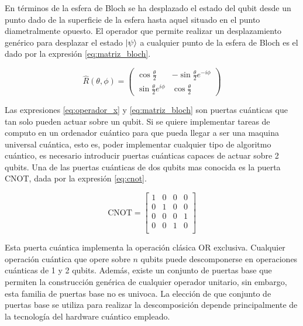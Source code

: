 En términos de la esfera de Bloch se ha desplazado el estado del qubit desde un punto dado de la superficie de la esfera hasta aquel situado en el punto diametralmente opuesto. El operador que permite realizar un desplazamiento genérico para desplazar el estado $\ket{\psi}$ a cualquier punto de la esfera de Bloch es el dado por la expresión \ref{eq:matriz_bloch}.

\begin{equation}
    \hat{R}(\theta, \phi) = 
    \begin{pmatrix}
        \cos{\frac{\theta}{2}} & -\sin{\frac{\theta}{2}}e^{-i\phi} \\
        \sin{\frac{\theta}{2}}e^{i\phi} & \cos{\frac{\theta}{2}}
    \end{pmatrix}
    \label{eq:matriz_bloch}
\end{equation}

Las expresiones \ref{eq:operador_x} y \ref{eq:matriz_bloch} son puertas cuánticas que tan solo pueden actuar sobre un qubit. Si se quiere implementar tareas de computo en un ordenador cuántico para que pueda llegar a ser una maquina universal cuántica, esto es, poder implementar cualquier tipo de algoritmo cuántico, es necesario introducir puertas cuánticas capaces de actuar sobre 2 qubits. Una de las puertas cuánticas de dos qubits mas conocida es la puerta CNOT, dada por la expresión \ref{eq:cnot}.

\newpage

\begin{equation}
    \text{CNOT} = \begin{bmatrix}
    1 & 0 & 0 & 0 \\
    0 & 1 & 0 & 0 \\
    0 & 0 & 0 & 1 \\
    0 & 0 & 1 & 0 \\
    \end{bmatrix}
    \label{eq:cnot}
\end{equation}

Esta puerta cuántica implementa la operación clásica OR exclusiva. Cualquier operación cuántica que opere sobre $n$ qubits puede descomponerse en operaciones cuánticas de 1 y 2 qubits. Además, existe un conjunto de puertas base que permiten la construcción genérica de cualquier operador unitario, sin embargo, esta familia de puertas base no es univoca. La elección de que conjunto de puertas base se utiliza para realizar la descomposición depende principalmente de la tecnología del hardware cuántico empleado. \\

